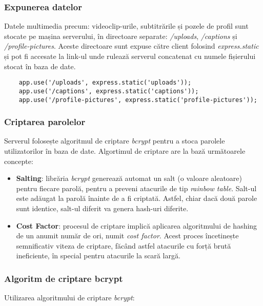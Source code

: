 \subsubsection{Expunerea datelor}
Datele multimedia precum: videoclip-urile, subtitrările și pozele de profil sunt stocate 
pe mașina serverului, în directoare separate: \textit{/uploads}, \textit{/captions} și
\textit{/profile-pictures}. Aceste directoare sunt expuse către client folosind
\textit{express.static} și pot fi accesate la link-ul unde rulează serverul concatenat
cu numele fișierului stocat în baza de date.


\begin{verbatim}
    app.use('/uploads', express.static('uploads'));
    app.use('/captions', express.static('captions'));
    app.use('/profile-pictures', express.static('profile-pictures'));
\end{verbatim}

\subsubsection{Criptarea parolelor}
Serverul folosește algoritmul de criptare \textit{bcrypt} pentru a stoca parolele utilizatorilor
în baza de date. Algortimul de criptare are la bază următoarele concepte:

\begin{itemize}
    \item \textbf{Salting}: librăria \textit{bcrypt} generează automat un salt (o valoare aleatoare)
    pentru fiecare parolă, pentru a preveni atacurile de tip \textit{rainbow table}. Salt-ul este
    adăugat la parolă înainte de a fi criptată. Astfel, chiar dacă două parole sunt identice,
    salt-ul diferit va genera hash-uri diferite.
    \item \textbf{Cost Factor}: procesul de criptare implică aplicarea algoritmului de hashing
    de un anumit număr de ori, numit \textit{cost factor}. Acest proces încetinește semnificativ
    viteza de criptare, făcând astfel atacurile cu forță brută ineficiente, în special pentru
    atacurile la scară largă.
\end{itemize}

\subsubsection{Algoritm de criptare bcrypt}

\par
Utilizarea algoritmului de criptare \textit{bcrypt}:

